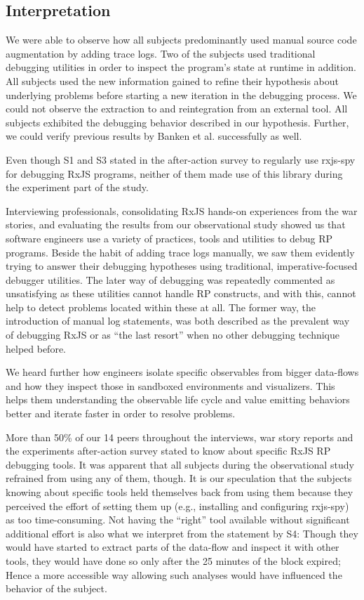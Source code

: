 \documentclass[sigplan,screen]{acmart}
\begin{document}
\subsection{Interpretation}

We were able to observe how all subjects predominantly used manual source code augmentation by adding trace logs. Two of the subjects used traditional debugging utilities in order to inspect the program's state at runtime in addition. All subjects used the new information gained to refine their hypothesis about underlying problems before starting a new iteration in the debugging process. We could not observe the extraction to and reintegration from an external tool. All subjects exhibited the debugging behavior described in our hypothesis. Further, we could verify previous results by Banken et al. \cite{10.1145/3180155.3180156} successfully as well.

Even though S1 and S3 stated in the after-action survey to regularly use rxjs-spy for debugging RxJS programs, neither of them made use of this library during the experiment part of the study.

Interviewing professionals, consolidating RxJS hands-on experiences from the war stories, and evaluating the results from our observational study showed us that software engineers use a variety of practices, tools and utilities to debug RP programs. Beside the habit of adding trace logs manually, we saw them evidently trying to answer their debugging hypotheses using traditional, imperative-focused debugger utilities. The later way of debugging was repeatedly commented as unsatisfying as these utilities cannot handle RP constructs, and with this, cannot help to detect problems located within these at all. The former way, the introduction of manual log statements, was both described as the prevalent way of debugging RxJS or as ``the last resort'' when no other debugging technique helped before.

We heard further how engineers isolate specific observables from bigger data-flows and how they inspect those in sandboxed environments and visualizers. This helps them understanding the observable life cycle and value emitting behaviors better and iterate faster in order to resolve problems.

More than 50\% of our 14 peers throughout the interviews, war story reports and the experiments after-action survey stated to know about specific RxJS RP debugging tools. It was apparent that all subjects during the observational study refrained from using any of them, though. It is our speculation that the subjects knowing about specific tools held themselves back from using them because they perceived the effort of setting them up (e.g., installing and configuring rxjs-spy) as too time-consuming. Not having the ``right'' tool available without significant additional effort is also what we interpret from the statement by S4: Though they would have started to extract parts of the data-flow and inspect it with other tools, they would have done so only after the 25 minutes of the block expired; Hence a more accessible way allowing such analyses would have influenced the behavior of the subject.
\end{document}
